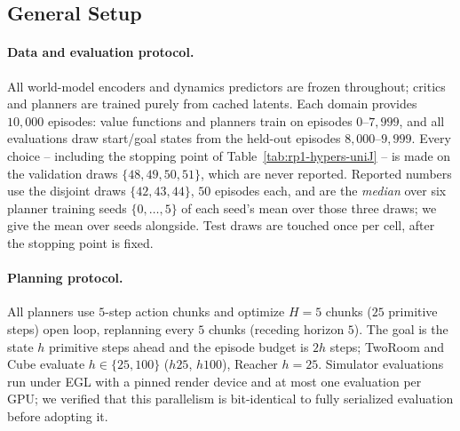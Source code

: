 
\subsection{General Setup}
\label{app:results-general}

\paragraph{Data and evaluation protocol.}
All world-model encoders and dynamics predictors are frozen throughout; critics and
planners are trained purely from cached latents. Each domain provides $10{,}000$
episodes: value functions and planners train on episodes $0$--$7{,}999$, and all
evaluations draw start/goal states from the held-out episodes $8{,}000$--$9{,}999$.
Every choice -- including the stopping point of Table~\ref{tab:rp1-hypers-uniJ} -- is
made on the validation draws $\{48,49,50,51\}$, which are never reported. Reported
numbers use the disjoint draws $\{42,43,44\}$, $50$ episodes each, and are the
\emph{median} over six planner training seeds $\{0,\dots,5\}$ of each seed's mean over
those three draws; we give the mean over seeds alongside. Test draws are touched once
per cell, after the stopping point is fixed.

\paragraph{Planning protocol.}
All planners use $5$-step action chunks and optimize $H{=}5$ chunks ($25$ primitive
steps) open loop, replanning every $5$ chunks (receding horizon $5$). The goal is the
state $h$ primitive steps ahead and the episode budget is $2h$ steps; TwoRoom and Cube
evaluate $h\in\{25,100\}$ ($h25$, $h100$), Reacher $h{=}25$. Simulator evaluations run
under EGL with a pinned render device and at most one evaluation per GPU; we verified
that this parallelism is bit-identical to fully serialized evaluation before adopting it.

